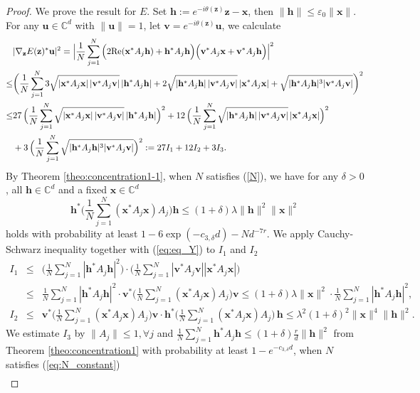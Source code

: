 \documentclass{article}
\renewcommand{\eqref}[1]{(\ref{#1})}
\newcommand{\C}{{\mathbb C}}
\newcommand{\re}{{\rm Re}}
\newcommand{\vx}{{\mathbf x}}
\newcommand{\vz}{{\mathbf z}}
\newcommand{\vv}{{\mathbf v}}
\newcommand{\vu}{{\mathbf u}}
\newcommand{\vh}{{\mathbf h}}
\newcommand{\0}{{\mathbf 0}}
\numberwithin{equation}{section}
\begin{document}
	\begin{proof}  We prove the result for $E$. Set $\vh:=e^{-i\theta(\vz)}\vz-\vx$, then $\|\vh\|\le\varepsilon_0\|\vx\|$. For any $\vu\in\C^d$ with $\|\vu\|=1$, let $\vv=e^{-i\theta(\vz)}\vu$, we calculate
		\begin{align*}
			& |\nabla_{\vz} E(\vz)^*\vu|^2
			=\Big|\frac{1}{N}\sum^N_{j=1}\Big(2\re(\vx^*A_j\vh)+\vh^*A_j\vh\Big)\Big(\vv^*A_j\vx+\vv^*A_j\vh\Big)\Big|^2\\
			\le&\bigg(\frac{1}{N}\sum^N_{j=1}3\sqrt{|\vx^*A_j\vx|\,|\vv^*A_j\vv|}\,|\vh^*A_j\vh|+2\sqrt{|\vh^*A_j\vh|\,|\vv^*A_j\vv|}\,|\vx^*A_j\vx|+\sqrt{|\vh^*A_j\vh|^3|\vv^*A_j\vv|}\bigg)^2\\
			\le& 27\,\Big(\frac{1}{N}\sum^N_{j=1}\sqrt{|\vx^*A_j\vx|\,|\vv^*A_j\vv|}\,|\vh^*A_j\vh|\Big)^2+12\,\Big(\frac{1}{N}\sum^N_{j=1}\sqrt{|\vh^*A_j\vh|\,|\vv^*A_j\vv|}\,|\vx^*A_j\vx|\Big)^2\\
			&+3\,\Big(\frac{1}{N}\sum^N_{j=1}\sqrt{|\vh^*A_j\vh|^3|\vv^*A_j\vv|}\Big)^2
			:= 27I_1+12I_2+3I_3.
		\end{align*}
		By Theorem \ref{theo:concentration1-1}, when $ N $ satisfies \eqref{N}, we have for any $\delta>0$, all $\vh\in\C^d$ and a fixed $\vx\in\C^d$
		\begin{equation}
			\label{eq:eq_Y}
			\vh^*\bigg(\frac{1}{N}\sum^N_{j=1}(\vx^*A_j\vx) A_j\bigg)\vh\le (1+\delta)\lambda\|\vh\|^2\|\vx\|^2
		\end{equation}
		holds with probability at least $1-6\exp(-c_{3,\delta} d)-Nd^{-7r}$. We apply Cauchy-Schwarz inequality together with \eqref{eq:eq_Y} to $I_1$ and $I_2$
		\begin{eqnarray*}
			I_1&\le&\bigg(\frac{1}{N}\sum^N_{j=1}|\vh^*A_j\vh|^2\bigg)\cdot\bigg(\frac{1}{N}\sum^N_{j=1}|\vv^*A_j\vv||\vx^*A_j\vx|\bigg)\\
			&\le&\frac{1}{N}\sum^N_{j=1}|\vh^*A_j\vh|^2\cdot\vv^*\bigg(\frac{1}{N}\sum^N_{j=1}(\vx^*A_j\vx) A_j\bigg)\vv
			\le(1+\delta)\lambda\|\vx\|^2\cdot\frac{1}{N}\sum^N_{j=1}|\vh^*A_j\vh|^2,\\
			I_2&\le&\vv^*\bigg(\frac{1}{N}\sum^N_{j=1}(\vx^*A_j\vx) A_j\bigg)\vv\cdot\vh^*\bigg(\frac{1}{N}\sum^N_{j=1}(\vx^*A_j\vx) A_j\bigg)\,\vh\le\lambda^2(1+\delta)^2\|\vx\|^4\|\vh\|^2.
		\end{eqnarray*}
		We estimate $I_3$ by $\|A_j\|\le 1,\forall j$ and $\frac{1}{N}\sum^N_{j=1}\vh^*A_j\vh\le(1+\delta)\frac{r}{d}\|\vh\|^2$ from Theorem \ref{theo:concentration1} with probability at least $1-e^{-c_{3,\delta}d}$, when $N$ satisfies \eqref{eq:N_constant}
		\begin{eqnarray*}

\end{eqnarray*}
\end{proof}
\end{document}
